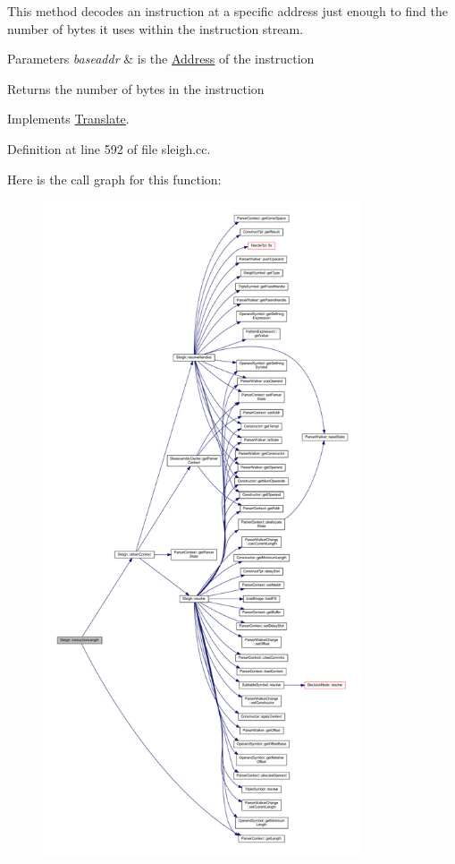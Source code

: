 This method decodes an instruction at a specific address just enough to find the number of bytes it uses within the instruction stream. 
\begin{DoxyParams}{Parameters}
{\em baseaddr} & is the \mbox{\hyperlink{class_address}{Address}} of the instruction \\
\hline
\end{DoxyParams}
\begin{DoxyReturn}{Returns}
the number of bytes in the instruction 
\end{DoxyReturn}


Implements \mbox{\hyperlink{class_translate_aa7139376886fccfdcda529fc74f7b382}{Translate}}.



Definition at line 592 of file sleigh.\+cc.

Here is the call graph for this function\+:
\nopagebreak
\begin{figure}[H]
\begin{center}
\leavevmode
\includegraphics[height=550pt]{class_sleigh_aec2a92a6246fd8d2704d1f853f01ee85_cgraph}
\end{center}
\end{figure}
\mbox{\label{class_sleigh_abab71643681aaa776f4e4c5d643be3a3}} 
